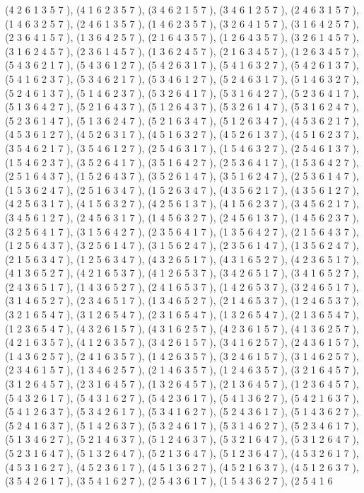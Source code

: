\documentclass[12pt]{article}
\begin{document}
\begin{enumerate}
(4 2 6 1 3 5 7  ), (4 1 6 2 3 5 7  ), (3 4 6 2 1 5 7  ), (3 4 6 1 2 5 7  ), (2 4 6 3 1 5 7  ), (1 4 6 3 2 5 7  ), (2 4 6 1 3 5 7  ), (1 4 6 2 3 5 7  ), (3 2 6 4 1 5 7  ), (3 1 6 4 2 5 7  ), (2 3 6 4 1 5 7  ), (1 3 6 4 2 5 7  ), (2 1 6 4 3 5 7  ), (1 2 6 4 3 5 7  ), (3 2 6 1 4 5 7  ), (3 1 6 2 4 5 7  ), (2 3 6 1 4 5 7  ), (1 3 6 2 4 5 7  ), (2 1 6 3 4 5 7  ), (1 2 6 3 4 5 7  ), (5 4 3 6 2 1 7  ), (5 4 3 6 1 2 7  ), (5 4 2 6 3 1 7  ), (5 4 1 6 3 2 7  ), (5 4 2 6 1 3 7  ), (5 4 1 6 2 3 7  ), (5 3 4 6 2 1 7  ), (5 3 4 6 1 2 7  ), (5 2 4 6 3 1 7  ), (5 1 4 6 3 2 7  ), (5 2 4 6 1 3 7  ), (5 1 4 6 2 3 7  ), (5 3 2 6 4 1 7  ), (5 3 1 6 4 2 7  ), (5 2 3 6 4 1 7  ), (5 1 3 6 4 2 7  ), (5 2 1 6 4 3 7  ), (5 1 2 6 4 3 7  ), (5 3 2 6 1 4 7  ), (5 3 1 6 2 4 7  ), (5 2 3 6 1 4 7  ), (5 1 3 6 2 4 7  ), (5 2 1 6 3 4 7  ), (5 1 2 6 3 4 7  ), (4 5 3 6 2 1 7  ), (4 5 3 6 1 2 7  ), (4 5 2 6 3 1 7  ), (4 5 1 6 3 2 7  ), (4 5 2 6 1 3 7  ), (4 5 1 6 2 3 7  ), (3 5 4 6 2 1 7  ), (3 5 4 6 1 2 7  ), (2 5 4 6 3 1 7  ), (1 5 4 6 3 2 7  ), (2 5 4 6 1 3 7  ), (1 5 4 6 2 3 7  ), (3 5 2 6 4 1 7  ), (3 5 1 6 4 2 7  ), (2 5 3 6 4 1 7  ), (1 5 3 6 4 2 7  ), (2 5 1 6 4 3 7  ), (1 5 2 6 4 3 7  ), (3 5 2 6 1 4 7  ), (3 5 1 6 2 4 7  ), (2 5 3 6 1 4 7  ), (1 5 3 6 2 4 7  ), (2 5 1 6 3 4 7  ), (1 5 2 6 3 4 7  ), (4 3 5 6 2 1 7  ), (4 3 5 6 1 2 7  ), (4 2 5 6 3 1 7  ), (4 1 5 6 3 2 7  ), (4 2 5 6 1 3 7  ), (4 1 5 6 2 3 7  ), (3 4 5 6 2 1 7  ), (3 4 5 6 1 2 7  ), (2 4 5 6 3 1 7  ), (1 4 5 6 3 2 7  ), (2 4 5 6 1 3 7  ), (1 4 5 6 2 3 7  ), (3 2 5 6 4 1 7  ), (3 1 5 6 4 2 7  ), (2 3 5 6 4 1 7  ), (1 3 5 6 4 2 7  ), (2 1 5 6 4 3 7  ), (1 2 5 6 4 3 7  ), (3 2 5 6 1 4 7  ), (3 1 5 6 2 4 7  ), (2 3 5 6 1 4 7  ), (1 3 5 6 2 4 7  ), (2 1 5 6 3 4 7  ), (1 2 5 6 3 4 7  ), (4 3 2 6 5 1 7  ), (4 3 1 6 5 2 7  ), (4 2 3 6 5 1 7  ), (4 1 3 6 5 2 7  ), (4 2 1 6 5 3 7  ), (4 1 2 6 5 3 7  ), (3 4 2 6 5 1 7  ), (3 4 1 6 5 2 7  ), (2 4 3 6 5 1 7  ), (1 4 3 6 5 2 7  ), (2 4 1 6 5 3 7  ), (1 4 2 6 5 3 7  ), (3 2 4 6 5 1 7  ), (3 1 4 6 5 2 7  ), (2 3 4 6 5 1 7  ), (1 3 4 6 5 2 7  ), (2 1 4 6 5 3 7  ), (1 2 4 6 5 3 7  ), (3 2 1 6 5 4 7  ), (3 1 2 6 5 4 7  ), (2 3 1 6 5 4 7  ), (1 3 2 6 5 4 7  ), (2 1 3 6 5 4 7  ), (1 2 3 6 5 4 7  ), (4 3 2 6 1 5 7  ), (4 3 1 6 2 5 7  ), (4 2 3 6 1 5 7  ), (4 1 3 6 2 5 7  ), (4 2 1 6 3 5 7  ), (4 1 2 6 3 5 7  ), (3 4 2 6 1 5 7  ), (3 4 1 6 2 5 7  ), (2 4 3 6 1 5 7  ), (1 4 3 6 2 5 7  ), (2 4 1 6 3 5 7  ), (1 4 2 6 3 5 7  ), (3 2 4 6 1 5 7  ), (3 1 4 6 2 5 7  ), (2 3 4 6 1 5 7  ), (1 3 4 6 2 5 7  ), (2 1 4 6 3 5 7  ), (1 2 4 6 3 5 7  ), (3 2 1 6 4 5 7  ), (3 1 2 6 4 5 7  ), (2 3 1 6 4 5 7  ), (1 3 2 6 4 5 7  ), (2 1 3 6 4 5 7  ), (1 2 3 6 4 5 7  ), (5 4 3 2 6 1 7  ), (5 4 3 1 6 2 7  ), (5 4 2 3 6 1 7  ), (5 4 1 3 6 2 7  ), (5 4 2 1 6 3 7  ), (5 4 1 2 6 3 7  ), (5 3 4 2 6 1 7  ), (5 3 4 1 6 2 7  ), (5 2 4 3 6 1 7  ), (5 1 4 3 6 2 7  ), (5 2 4 1 6 3 7  ), (5 1 4 2 6 3 7  ), (5 3 2 4 6 1 7  ), (5 3 1 4 6 2 7  ), (5 2 3 4 6 1 7  ), (5 1 3 4 6 2 7  ), (5 2 1 4 6 3 7  ), (5 1 2 4 6 3 7  ), (5 3 2 1 6 4 7  ), (5 3 1 2 6 4 7  ), (5 2 3 1 6 4 7  ), (5 1 3 2 6 4 7  ), (5 2 1 3 6 4 7  ), (5 1 2 3 6 4 7  ), (4 5 3 2 6 1 7  ), (4 5 3 1 6 2 7  ), (4 5 2 3 6 1 7  ), (4 5 1 3 6 2 7  ), (4 5 2 1 6 3 7  ), (4 5 1 2 6 3 7  ), (3 5 4 2 6 1 7  ), (3 5 4 1 6 2 7  ), (2 5 4 3 6 1 7  ), (1 5 4 3 6 2 7  ), (2 5 4 1 6 
\end{enumerate}
\end{document}
